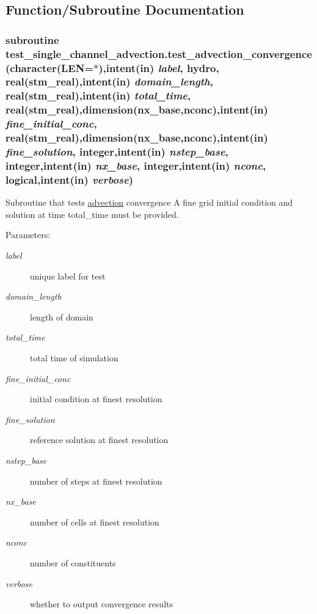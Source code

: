 \subsection{Function/Subroutine Documentation}
\hypertarget{a00094_8ef07d31d9dd8f57f48c1998b88cca1a}{
\subsubsection[{test\_\-advection\_\-convergence}]{\setlength{\rightskip}{0pt plus 5cm}subroutine test\_\-single\_\-channel\_\-advection.test\_\-advection\_\-convergence (character(LEN=$\ast$),intent(in) {\em label}, \/  hydro, \/  real(stm\_\-real),intent(in) {\em domain\_\-length}, \/  real(stm\_\-real),intent(in) {\em total\_\-time}, \/  real(stm\_\-real),dimension(nx\_\-base,nconc),intent(in) {\em fine\_\-initial\_\-conc}, \/  real(stm\_\-real),dimension(nx\_\-base,nconc),intent(in) {\em fine\_\-solution}, \/  integer,intent(in) {\em nstep\_\-base}, \/  integer,intent(in) {\em nx\_\-base}, \/  integer,intent(in) {\em nconc}, \/  logical,intent(in) {\em verbose})}}
\label{a00094_8ef07d31d9dd8f57f48c1998b88cca1a}


Subroutine that tests \hyperlink{a00052}{advection} convergence A fine grid initial condition and solution at time total\_\-time must be provided. 

\begin{Desc}
\item[Parameters:]
\begin{description}
\item[{\em label}]unique label for test\item[{\em domain\_\-length}]length of domain\item[{\em total\_\-time}]total time of simulation\item[{\em fine\_\-initial\_\-conc}]initial condition at finest resolution\item[{\em fine\_\-solution}]reference solution at finest resolution\item[{\em nstep\_\-base}]number of steps at finest resolution\item[{\em nx\_\-base}]number of cells at finest resolution\item[{\em nconc}]number of constituents\item[{\em verbose}]whether to output convergence results \end{description}
\end{Desc}
